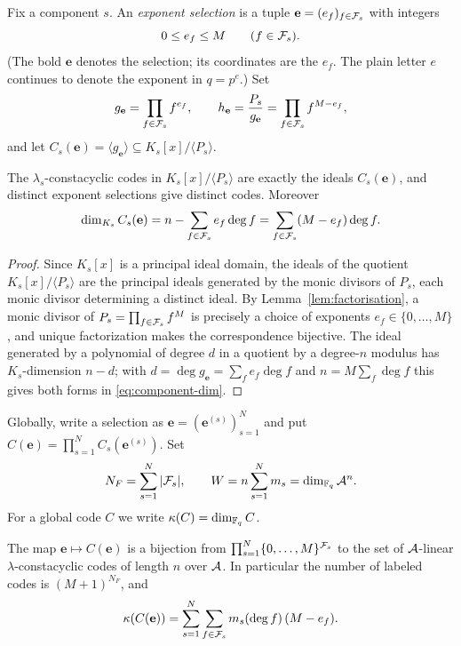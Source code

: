 Fix a component $s$.  An \emph{exponent selection} is a tuple
$\mathbf{e}=(e_f)_{f\in\mathcal F_s}$ with integers
\[
0\leq e_f\leq M\qquad(f\in\mathcal F_s).
\]
(The bold $\mathbf{e}$ denotes the selection; its coordinates are the $e_f$.
The plain letter $e$ continues to denote the exponent in $q=p^e$.)  Set
\[
g_{\mathbf{e}}=\prod_{f\in\mathcal F_s}f^{e_f},
\qquad
h_{\mathbf{e}}=\frac{P_s}{g_{\mathbf{e}}}
   =\prod_{f\in\mathcal F_s}f^{M-e_f},
\]
and let $C_s(\mathbf{e})=\langle g_{\mathbf{e}}\rangle\subseteq
K_s[x]/\langle P_s\rangle$.

\begin{lemma}\label{lem:component-selection}
The $\lambda_s$-constacyclic codes in $K_s[x]/\langle P_s\rangle$ are exactly
the ideals $C_s(\mathbf{e})$, and distinct exponent selections give distinct
codes.  Moreover
\begin{equation}\label{eq:component-dim}
\dim_{K_s}C_s(\mathbf{e})
   =n-\sum_{f\in\mathcal F_s}e_f\deg f
   =\sum_{f\in\mathcal F_s}(M-e_f)\deg f .
\end{equation}
\end{lemma}

\begin{proof}
Since $K_s[x]$ is a principal ideal domain, the ideals of the quotient
$K_s[x]/\langle P_s\rangle$ are the principal ideals generated by the monic
divisors of $P_s$, each monic divisor determining a distinct ideal.  By
Lemma~\ref{lem:factorisation}, a monic divisor of
$P_s=\prod_{f\in\mathcal F_s}f^M$ is precisely a choice of exponents
$e_f\in\{0,\ldots,M\}$, and unique factorization makes the correspondence
bijective.  The ideal generated by a polynomial of degree $d$ in a quotient by a
degree-$n$ modulus has $K_s$-dimension $n-d$; with
$d=\deg g_{\mathbf{e}}=\sum_f e_f\deg f$ and $n=M\sum_f\deg f$ this gives both
forms in \eqref{eq:component-dim}.
\end{proof}

Globally, write a selection as
$\mathbf{e}=(\mathbf{e}^{(s)})_{s=1}^{N}$ and put
$C(\mathbf{e})=\prod_{s=1}^{N}C_s(\mathbf{e}^{(s)})$.  Set
\[
N_F=\sum_{s=1}^{N}|\mathcal F_s|,
\qquad
W=n\sum_{s=1}^{N}m_s=\dim_{\mathbb F_q}\mathcal A^n .
\]
For a global code $C$ we write $\kappa(C)=\dim_{\mathbb F_q}C$.

\begin{proposition}\label{prop:global-selection}
The map $\mathbf{e}\mapsto C(\mathbf{e})$ is a bijection from
$\prod_{s=1}^{N}\{0,\ldots,M\}^{\mathcal F_s}$ to the set of $\mathcal A$-linear
$\lambda$-constacyclic codes of length $n$ over $\mathcal A$.  In particular the number
of labeled codes is $(M+1)^{N_F}$, and
\begin{equation}\label{eq:kappa}
\kappa(C(\mathbf{e}))
   =\sum_{s=1}^{N}\sum_{f\in\mathcal F_s}m_s(\deg f)\,(M-e_f).
\end{equation}
\end{proposition}

